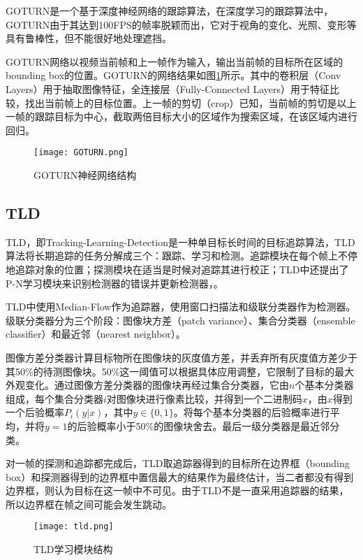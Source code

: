   GOTURN是一个基于深度神经网络的跟踪算法\cite{held2016learning}，在深度学习的跟踪算法中，GOTURN由于其达到100FPS的帧率脱颖而出，它对于视角的变化、光照、变形等具有鲁棒性，但不能很好地处理遮挡。

  GOTURN网络以视频当前帧和上一帧作为输入，输出当前帧的目标所在区域的bounding box的位置。GOTURN的网络结果如图\ref{fig:GOTURN}所示。其中的卷积层（Conv Layers）用于抽取图像特征，全连接层（Fully-Connected Layers）用于特征比较，找出当前帧上的目标位置。上一帧的剪切（crop）已知，当前帧的剪切是以上一帧的跟踪目标为中心，截取两倍目标大小的区域作为搜索区域，在该区域内进行回归。

\begin{figure}[htb]
  \centering
  \texttt{[image: GOTURN.png]}
  \caption{GOTURN神经网络结构}
  \label{fig:GOTURN}
\end{figure}

\subsection{TLD}

  TLD，即Tracking-Learning-Detection是一种单目标长时间的目标追踪算法，TLD算法将长期追踪的任务分解成三个：跟踪、学习和检测。追踪模块在每个帧上不停地追踪对象的位置；探测模块在适当是时候对追踪其进行校正；TLD中还提出了P-N学习模块来识别检测器的错误并更新检测器，\cite{kalal2012tracking}。

  TLD中使用Median-Flow作为追踪器，使用窗口扫描法和级联分类器作为检测器。级联分类器分为三个阶段：图像块方差（patch variance）、集合分类器（ensemble classifier）和最近邻（nearest neighbor）。

  图像方差分类器计算目标物所在图像块的灰度值方差，并丢弃所有灰度值方差少于其50\%的待测图像块。50\%这一阈值可以根据具体应用调整，它限制了目标的最大外观变化。通过图像方差分类器的图像块再经过集合分类器，它由$n$个基本分类器组成，每个集合分类器$i$对图像块进行像素比较，并得到一个二进制码$x$，由$x$得到一个后验概率$P_i(y|x)$，其中$y\in\{0,1\}$。将每个基本分类器的后验概率进行平均，并将$y=1$的后验概率小于50\%的图像块舍去。最后一级分类器是最近邻分类。

  对一帧的探测和追踪都完成后，TLD取追踪器得到的目标所在边界框（bounding box）和探测器得到的边界框中置信最大的结果作为最终估计，当二者都没有得到边界框，则认为目标在这一帧中不可见。由于TLD不是一直采用追踪器的结果，所以边界框在帧之间可能会发生跳动。

\begin{figure}[htb]
  \centering
  \texttt{[image: tld.png]}
  \caption{TLD学习模块结构}
  \label{fig:tldlearning}
\end{figure}

